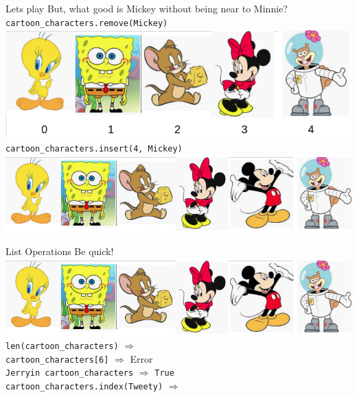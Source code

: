     \begin{frame} {Let\textquotesingle s play}
        But, what good is Mickey without being near to Minnie?\\
        \pause
        \texttt{cartoon\_characters.remove(\textquotesingle Mickey\textquotesingle )}\\
        \pause
        \includegraphics[width=.77\textwidth]{images/list_cartoons/list_after_remove.png}   
        \pause
        \texttt{cartoon\_characters.insert(4, \textquotesingle Mickey\textquotesingle )}\\
        \pause
        \includegraphics[width=.89\textwidth]{images/list_cartoons/list_after_insert.png}       
    \end{frame}

    \begin{frame}{List Operations}
        \Large
        Be quick!\\
        \includegraphics[width=\textwidth]{images/list_cartoons/list_after_insert.png}     
        \texttt{len(cartoon\_characters)}  $\Rightarrow$ \\
        \pause \texttt{cartoon\_characters[6]}  $\Rightarrow$ \pause Error\\
        \pause \texttt{\textquotesingle Jerry\textquotesingle  in cartoon\_characters}  $\Rightarrow$ \pause \texttt{True}\\
        \pause \texttt{cartoon\_characters.index(\textquotesingle Tweety\textquotesingle )}  $\Rightarrow$ \\
    \end{frame}

